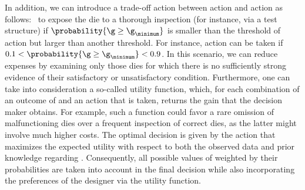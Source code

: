In addition, we can introduce a trade-off action between action \one and action
\two as follows: \three~to expose the die to a thorough inspection (for
instance, via a test structure) if $\probability{\g \geq \g_\minimum}$ is
smaller than the threshold of action \one but larger than another threshold. For
instance, action \three can be taken if $0.1 < \probability{\g \geq \g_\minimum}
< 0.9$. In this scenario, we can reduce expenses by examining only those dies
for which there is no sufficiently strong evidence of their satisfactory or
unsatisfactory condition. Furthermore, one can take into consideration a
so-called utility function, which, for each combination of an outcome of \g and
an action that is taken, returns the gain that the decision maker obtains. For
example, such a function could favor a rare omission of malfunctioning dies over
a frequent inspection of correct dies, as the latter might involve much higher
costs. The optimal decision is given by the action that maximizes the expected
utility with respect to both the observed data and prior knowledge regarding \g.
Consequently, all possible values of \g weighted by their probabilities are
taken into account in the final decision while also incorporating the
preferences of the designer via the utility function.
